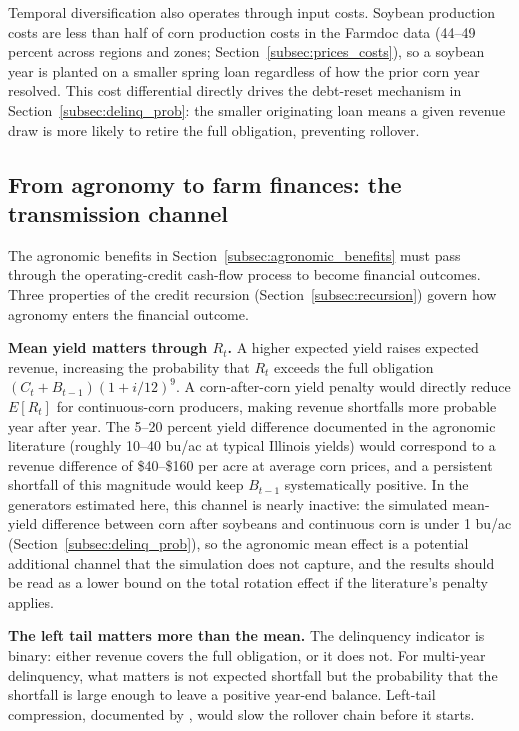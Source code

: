 \documentclass[11pt,letterpaper]{article}
\theoremstyle{remark}
\begin{document}
Temporal diversification also operates through input costs. Soybean production costs are less than half of corn production costs in the Farmdoc data (44--49 percent across regions and zones; Section~\ref{subsec:prices_costs}), so a soybean year is planted on a smaller spring loan regardless of how the prior corn year resolved. This cost differential directly drives the debt-reset mechanism in Section~\ref{subsec:delinq_prob}: the smaller originating loan means a given revenue draw is more likely to retire the full obligation, preventing rollover.
 
\subsection{\label{subsec:transmission_channel}From agronomy to farm finances: the transmission channel}
 
The agronomic benefits in Section~\ref{subsec:agronomic_benefits} must pass through the operating-credit cash-flow process to become financial outcomes. Three properties of the credit recursion (Section~\ref{subsec:recursion}) govern how agronomy enters the financial outcome.
 
\textbf{Mean yield matters through $R_t$.} A higher expected yield raises expected revenue, increasing the probability that $R_t$ exceeds the full obligation $(C_t + B_{t-1})(1 + i/12)^{9}$. A corn-after-corn yield penalty would directly reduce $E[R_t]$ for continuous-corn producers, making revenue shortfalls more probable year after year. The 5--20 percent yield difference documented in the agronomic literature (roughly 10--40 bu/ac at typical Illinois yields) would correspond to a revenue difference of \$40--\$160 per acre at average corn prices, and a persistent shortfall of this magnitude would keep $B_{t-1}$ systematically positive. In the generators estimated here, this channel is nearly inactive: the simulated mean-yield difference between corn after soybeans and continuous corn is under 1 bu/ac (Section~\ref{subsec:delinq_prob}), so the agronomic mean effect is a potential additional channel that the simulation does not capture, and the results should be read as a lower bound on the total rotation effect if the literature's penalty applies.
 
\textbf{The left tail matters more than the mean.} The delinquency indicator is binary: either revenue covers the full obligation, or it does not. For multi-year delinquency, what matters is not expected shortfall but the probability that the shortfall is large enough to leave a positive year-end balance. Left-tail compression, documented by \citet{Bowles2020}, would slow the rollover chain before it starts.
 
\end{document}
